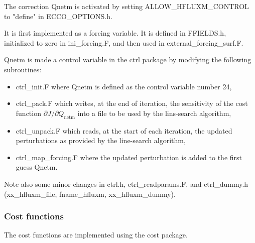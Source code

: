 The correction Qnetm is activated by setting ALLOW\_HFLUXM\_CONTROL to "define" in ECCO\_OPTIONS.h.

It is first implemented as a forcing variable. It is defined in FFIELDS.h,
initialized to zero in ini\_forcing.F, and then used in external\_forcing\_surf.F.

Qnetm is made a control variable in the ctrl package by modifying the following subroutines:

\begin{itemize}
\item ctrl\_init.F where Qnetm is defined as the control variable number 24,

\item ctrl\_pack.F which writes, at the end of iteration, the sensitivity of the cost function
$\partial J/\partial Q_\mathrm{netm}$ into a file to be used by the lins-search algorithm,

\item ctrl\_unpack.F which reads, at the start of each iteration, the updated perturbations as
provided by the line-search algorithm,

\item ctrl\_map\_forcing.F where the updated perturbation is added to the first guess Qnetm.
\end{itemize}

Note also some minor changes in ctrl.h, ctrl\_readparams.F, and ctrl\_dummy.h (xx\_hfluxm\_file,
fname\_hfluxm, xx\_hfluxm\_dummy).

\subsubsection{Cost functions}

The cost functions are implemented using the cost package.

